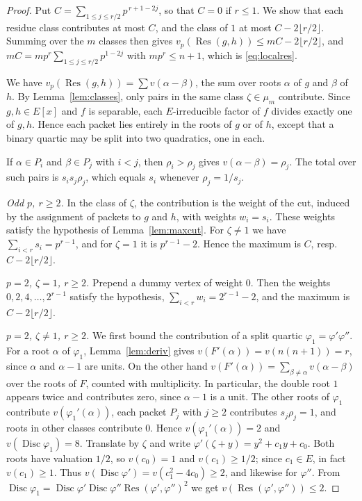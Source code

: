 \documentclass[11pt]{amsart}
\theoremstyle{definition}
\theoremstyle{remark}
\numberwithin{equation}{section}
\newcommand{\Disc}{\operatorname{Disc}}
\newcommand{\Res}{\operatorname{Res}}
\begin{document}
\begin{proof}
Put $C=\sum_{1\le j\le r/2}p^{\,r+1-2j}$, so that $C=0$ if $r\le1$. We show
that each residue class contributes at most $C$, and the class of $1$ at
most $C-2\lfloor r/2\rfloor$. Summing over the $m$ classes then gives
$v_p(\Res(g,h))\le mC-2\lfloor r/2\rfloor$, and
$mC=mp^r\sum_{1\le j\le r/2}p^{1-2j}$ with $mp^r\le n+1$, which is
\eqref{eq:localres}.

We have $v_p(\Res(g,h))=\sum v(\alpha-\beta)$, the sum over roots $\alpha$
of $g$ and $\beta$ of $h$. By Lemma~\ref{lem:classes}, only pairs in the
same class $\zeta\in\mu_m$ contribute. Since $g,h\in E[x]$ and $f$ is
separable, each $E$-irreducible factor of $f$ divides exactly one of
$g,h$. Hence each packet lies entirely in the roots of $g$ or of $h$,
except that a binary quartic may be split into two quadratics, one in
each.

If $\alpha\in P_i$ and $\beta\in P_j$ with $i<j$, then $\rho_i>\rho_j$
gives $v(\alpha-\beta)=\rho_j$. The total over such pairs is
$s_is_j\rho_j$, which equals $s_i$ whenever $\rho_j=1/s_j$.

\emph{Odd $p$, $r\ge2$.} In the class of $\zeta$, the contribution is the weight of
the cut, induced by the assignment of packets to $g$ and $h$, with weights
$w_i=s_i$. These weights satisfy the hypothesis of Lemma~\ref{lem:maxcut}.
For $\zeta\ne1$ we have $\sum_{i<r}s_i=p^{r-1}$, and for $\zeta=1$ it is
$p^{r-1}-2$. Hence the maximum is $C$, resp.\
$C-2\lfloor r/2\rfloor$.

\emph{$p=2$, $\zeta=1$, $r\ge2$.} Prepend a dummy vertex of weight $0$.
Then the weights $0,2,4,\dots,2^{r-1}$ satisfy the hypothesis,
$\sum_{i<r}w_i=2^{r-1}-2$, and the maximum is $C-2\lfloor r/2\rfloor$.

\emph{$p=2$, $\zeta\ne1$, $r\ge2$.} We first bound the contribution of a
split quartic $\varphi_1=\varphi'\varphi''$. For a root $\alpha$ of
$\varphi_1$, Lemma~\ref{lem:deriv} gives $v(F'(\alpha))=v(n(n+1))=r$, since
$\alpha$ and $\alpha-1$ are units. On the other hand
$v(F'(\alpha))=\sum_{\beta\ne\alpha}v(\alpha-\beta)$ over the roots of
$F$, counted with multiplicity. In particular, the double root $1$
appears twice and contributes zero, since $\alpha-1$ is a unit.
The other roots of $\varphi_1$ contribute
$v(\varphi_1'(\alpha))$, each packet $P_j$ with $j\ge2$ contributes
$s_j\rho_j=1$, and roots in other classes contribute $0$. Hence
$v(\varphi_1'(\alpha))=2$ and $v(\Disc\varphi_1)=8$. Translate by $\zeta$
and write $\varphi'(\zeta+y)=y^2+c_1y+c_0$. Both roots have valuation
$1/2$, so $v(c_0)=1$ and $v(c_1)\ge1/2$; since $c_1\in E$, in fact
$v(c_1)\ge1$. Thus $v(\Disc\varphi')=v(c_1^2-4c_0)\ge2$, and likewise for
$\varphi''$. From $\Disc\varphi_1=\Disc\varphi'\Disc\varphi''
\Res(\varphi',\varphi'')^2$ we get $v(\Res(\varphi',\varphi''))\le2$.


\end{proof}
\end{document}
